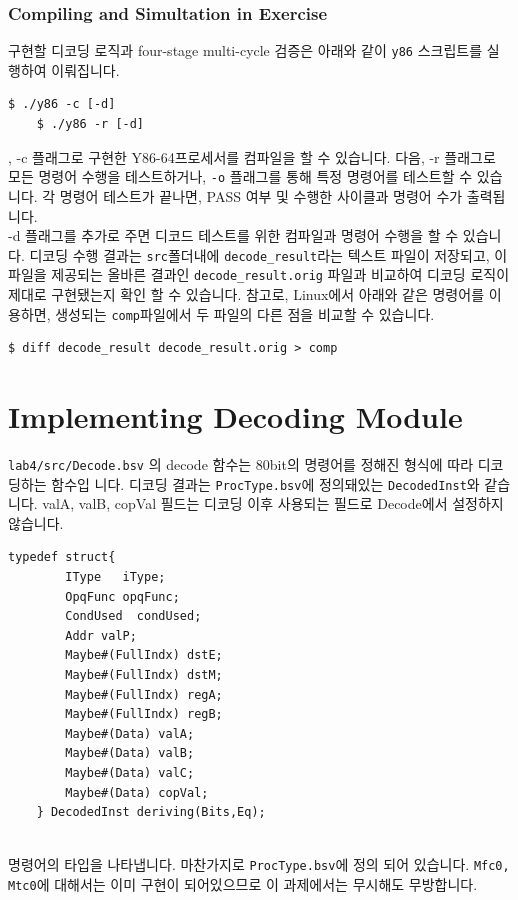 \documentclass{article}
\begin{document}
 \subsubsection{Compiling and Simultation in Exercise}
 구현할 디코딩 로직과 four-stage multi-cycle 검증은 아래와 같이 \texttt{y86}
 스크립트를 실행하여 이뤄집니다. 
\begin{Verbatim}[frame=single]
    $ ./y86 -c [-d]
    $ ./y86 -r [-d]
\end{Verbatim}
, -c 플래그로 구현한 Y86-64프로세서를 컴파일을 할 수 있습니다.
다음, -r 플래그로 모든 명령어 수행을 테스트하거나, \texttt{-o} 플래그를 통해 특정 명령어를
테스트할 수 있습니다. 각 명령어 테스트가 끝나면, PASS 여부 및 수행한 사이클과 명령어 수가 출력됩니다.\\
\noindent-d 플래그를 추가로 주면 디코드 테스트를 위한 컴파일과 명령어 수행을 할 수 있습니다.
 디코딩 수행 결과는 \texttt{src}폴더내에
\texttt{decode\_result}라는 텍스트 파일이 저장되고, 이 파일을 제공되는 올바른
결과인 \texttt{decode\_result.orig} 
파일과 비교하여 디코딩 로직이 제대로 구현됐는지 확인 할 수 있습니다. 참고로, Linux에서 아래와 같은
명령어를 이용하면, 생성되는 \texttt{comp}파일에서 두 파일의 다른 점을 비교할 수 있습니다.
\begin{Verbatim}[frame=single]
    $ diff decode_result decode_result.orig > comp 
\end{Verbatim}

\section{Implementing Decoding Module}

\texttt{lab4/src/Decode.bsv} 의 decode 함수는 80bit의 명령어를 정해진 형식에 따라 디코딩하는 함수입
니다. 디코딩 결과는 \texttt{ProcType.bsv}에 정의돼있는 \texttt{DecodedInst}와 같습니다.
valA, valB, copVal 필드는 디코딩 이후 사용되는 필드로 Decode에서 설정하지 않습니다.

\begin{Verbatim}[frame=single]
	typedef struct{
		IType   iType;
		OpqFunc opqFunc;
		CondUsed  condUsed;
		Addr valP;
		Maybe#(FullIndx) dstE;
		Maybe#(FullIndx) dstM;
		Maybe#(FullIndx) regA;
		Maybe#(FullIndx) regB;
		Maybe#(Data) valA;
		Maybe#(Data) valB;
		Maybe#(Data) valC;
		Maybe#(Data) copVal;
	} DecodedInst deriving(Bits,Eq);
\end{Verbatim}

\\
명령어의 타입을 나타냅니다. 마찬가지로 \texttt{ProcType.bsv}에 정의 되어 있습니다. \texttt{Mfc0, Mtc0}에
대해서는 이미 구현이 되어있으므로 이 과제에서는 무시해도 무방합니다.
\end{document}
